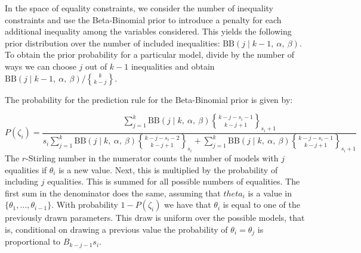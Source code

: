 \documentclass[11pt,a4paper]{article}
\theoremstyle{definition} %
\theoremstyle{case}
\newcommand{\BetaBinom}[4]{\text{BB}\left(#1 \mid #2 ,\ #3 ,\ #4 \right)}
\DeclareRobustCommand{\stirling}{\genfrac\{\}{0pt}{}}
\newcommand{\rstirling}[3]{\stirling{#1}{#2}_{#3}}
\newcommand{\bellnum}[1]{B_{#1}}
\begin{document}
In the space of equality constraints, we consider the number of inequality constraints and use the Beta-Binomial prior to introduce a penalty for each additional inequality among the variables considered. This yields the following prior distribution over the number of included inequalities: $\BetaBinom{j}{k-1}{\alpha}{\beta}$. To obtain the prior probability for a particular model, divide by the number of ways we can choose $j$ out of $k-1$ inequalities and obtain $\BetaBinom{j}{k-1}{\alpha}{\beta} / \stirling{k}{k-j}$.


The probability for the prediction rule for the Beta-Binomial prior is given by:

\begin{equation}
    P(\zeta_i) = \frac{
        \sum_{j=1}^k \BetaBinom{j}{k}{\alpha}{\beta} \rstirling{k-j-s_i-1}{k-j+1}{s_i + 1}
    }{
        s_i \sum_{j=1}^k \BetaBinom{j}{k}{\alpha}{\beta} \rstirling{k-j-s_i-2}{k-j+1}{s_i    } +
          \sum_{j=1}^k \BetaBinom{j}{k}{\alpha}{\beta} \rstirling{k-j-s_i-1}{k-j+1}{s_i + 1}
    }
\end{equation}
The $r$-Stirling number in the numerator counts the number of models with $j$ equalities if $\theta_i$ is a new value. Next, this is multiplied by the probability of including $j$ equalities. This is summed for all possible numbers of equalities. 
The first sum in the denominator does the same, assuming that $theta_i$ is a value in $\{\theta_1, \dots, \theta_{i-1}\}$. With probability $1 - P(\zeta_i)$ we have that $\theta_i$ is equal to one of the previously drawn parameters. This draw is uniform over the possible models, that is, conditional on drawing a previous value the probability of $\theta_i = \theta_j$ is proportional to $\bellnum{k-j-1}{s_i}$.
\end{document}
